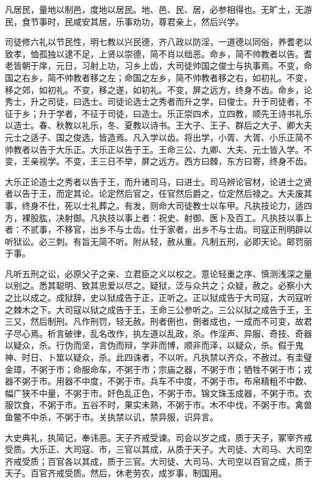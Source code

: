 \documentclass[]{article}
\begin{document}
凡居民，量地以制邑，度地以居民。地、邑、民、居，必参相得也。无旷土，无游民，食节事时，民咸安其居，乐事劝功，尊君亲上，然后兴学。

司徒修六礼以节民性，明七教以兴民德，齐八政以防淫，一道德以同俗，养耆老以致孝，恤孤独以逮不足，上贤以崇德，简不肖以绌恶。命乡，简不帅教者以告。耆老皆朝于庠，元日，习射上功，习乡上齿，大司徒帅国之俊士与执事焉。不变，命国之右乡，简不帅教者移之左；命国之左乡，简不帅教者移之右，如初礼。不变，移之郊，如初礼。不变，移之遂，如初礼。不变，屏之远方，终身不齿。命乡，论秀士，升之司徒，曰选士。司徒论选士之秀者而升之学，曰俊士。升于司徒者，不征于乡；升于学者，不征于司徒，曰造士。乐正崇四术，立四教，顺先王诗书礼乐以造士。春、秋教以礼乐，冬、夏教以诗书。王大子、王子、群后之大子、卿大夫元士之适子、国之俊选，皆造焉。凡入学以齿。将出学，小胥、大胥、小乐正简不帅教者以告于大乐正。大乐正以告于王。王命三公、九卿、大夫、元士皆入学。不变，王亲视学。不变，王三日不举，屏之远方。西方曰棘，东方曰寄，终身不齿。

大乐正论造士之秀者以告于王，而升诸司马，曰进士。司马辨论官材，论进士之贤者以告于王，而定其论。论定然后官之，任官然后爵之，位定然后禄之。大夫废其事，终身不仕，死以士礼葬之。有发，则命大司徒教士以车甲。凡执技论力，适四方，裸股肱，决射御。凡执技以事上者：祝史、射御、医卜及百工。凡执技以事上者：不贰事，不移官，出乡不与士齿。仕于家者，出乡不与士齿。司寇正刑明辟以听狱讼。必三刺。有旨无简不听。附从轻，赦从重。凡制五刑，必即天论。邮罚丽于事。

凡听五刑之讼，必原父子之亲、立君臣之义以权之。意论轻重之序、慎测浅深之量以别之。悉其聪明、致其忠爱以尽之。疑狱，泛与众共之；众疑，赦之。必察小大之比以成之。成狱辞，史以狱成告于正，正听之。正以狱成告于大司寇，大司寇听之棘木之下。大司寇以狱之成告于王，王命三公参听之。三公以狱之成告于王，王三又，然后制刑。凡作刑罚，轻无赦。刑者侀也，侀者成也，一成而不可变，故君子尽心焉。析言破律，乱名改作，执左道以乱政，杀。作淫声、异服、奇技、奇器以疑众，杀。行伪而坚，言伪而辩，学非而博，顺非而泽，以疑众，杀。假于鬼神、时日、卜筮以疑众，杀。此四诛者，不以听。凡执禁以齐众，不赦过。有圭璧金璋，不粥于市；命服命车，不粥于市；宗庙之器，不粥于市；牺牲不粥于市；戎器不粥于市。用器不中度，不粥于市。兵车不中度，不粥于市。布帛精粗不中数、幅广狭不中量，不粥于市。奸色乱正色，不粥于市。锦文珠玉成器，不粥于市。衣服饮食，不粥于市。五谷不时，果实未熟，不粥于市。木不中伐，不粥于市。禽兽鱼鳖不中杀，不粥于市。关执禁以讥，禁异服，识异言。

大史典礼，执简记，奉讳恶。天子齐戒受谏。司会以岁之成，质于天子，冢宰齐戒受质。大乐正、大司寇、市，三官以其成，从质于天子。大司徒、大司马、大司空齐戒受质；百官各以其成，质于三官。大司徒、大司马、大司空以百官之成，质于天子。百官齐戒受质。然后，休老劳农，成岁事，制国用。
\end{document}
